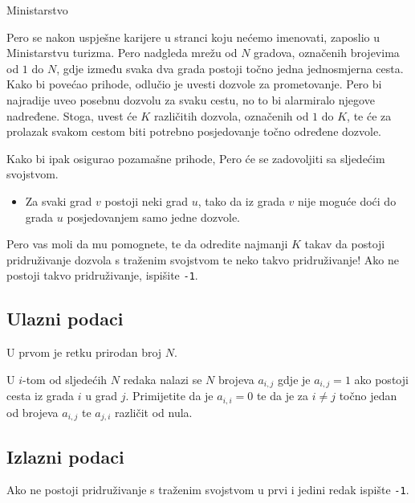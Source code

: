 \begin{statement}[
  problempoints=100,
  timelimit=1 sekunda,
  memorylimit=1024 MiB,
]{Ministarstvo}

Pero se nakon uspješne karijere u stranci koju nećemo imenovati, zaposlio u Ministarstvu turizma. Pero nadgleda mrežu od $N$ gradova, označenih brojevima od $1$ do $N$, gdje između svaka dva grada postoji točno jedna jednosmjerna cesta. Kako bi povećao prihode, odlučio je uvesti dozvole za prometovanje. Pero bi najradije uveo posebnu dozvolu za svaku cestu, no to bi alarmiralo njegove nadređene. Stoga, uvest će $K$ različitih dozvola, označenih od $1$ do $K$, te će za prolazak svakom cestom biti potrebno posjedovanje točno određene dozvole. 

Kako bi ipak osigurao pozamašne prihode, Pero će se zadovoljiti sa sljedećim svojstvom.

\begin{itemize}
\item Za svaki grad $v$ postoji neki grad $u$, tako da iz grada $v$ nije moguće doći do grada $u$ posjedovanjem samo jedne dozvole.
\end{itemize} 

Pero vas moli da mu pomognete, te da odredite najmanji $K$ takav da postoji pridruživanje dozvola s traženim svojstvom te neko takvo pridruživanje! Ako ne postoji takvo pridruživanje, ispišite \texttt{-1}. 

\subsection*{Ulazni podaci}

U prvom je retku prirodan broj $N$.

U $i$-tom od sljedećih $N$ redaka nalazi se $N$ brojeva $a_{i, j}$ gdje je $a_{i, j} = 1$ ako postoji cesta iz grada $i$ u grad $j$. Primijetite da je $a_{i, i} = 0$ te da je za $i \neq j$ točno jedan od brojeva $a_{i, j}$ te $a_{j, i}$ različit od nula. 

\subsection*{Izlazni podaci}

Ako ne postoji pridruživanje s traženim svojstvom u prvi i jedini redak ispište \texttt{-1}.


\end{statement}
